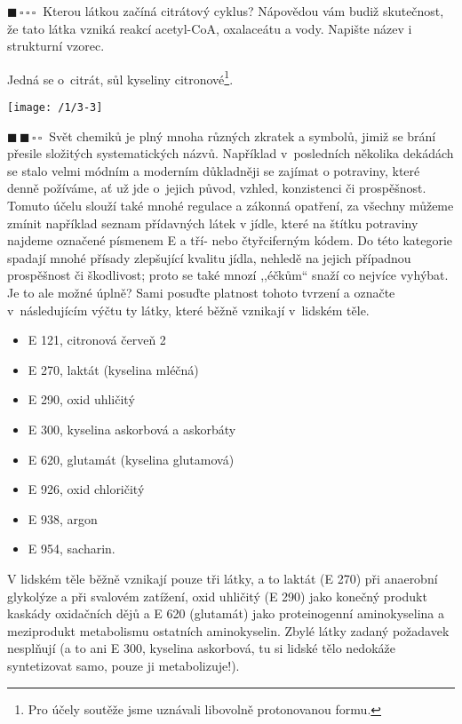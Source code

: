 \documentclass{book}
\newcommand{\jeden}{$\blacksquare \, \square \, \square \, \square \; \; $}
\newcommand{\dva}{$\blacksquare \, \blacksquare \, \square \, \square \; \; $}
\renewenvironment{quotation}{\par}{\par} %
\begin{document}
\hrulefill %
\begin{quotation}
\jeden Kterou látkou začíná citrátový cyklus? Nápovědou vám budiž skutečnost,
že tato látka vzniká reakcí acetyl-CoA, oxalaceátu a vody. Napište
název i strukturní vzorec.
\end{quotation} \dotfill \par 
Jedná se o~citrát, sůl kyseliny citronové\footnote{Pro účely soutěže jsme uznávali libovolně protonovanou formu.}. 

\begin{center}
\texttt{[image: /1/3-3]}
\end{center}


\newpage %
\begin{quotation}
\dva Svět chemiků je plný mnoha různých zkratek a symbolů, jimiž se brání
přesile složitých systematických názvů. Například v~posledních několika
dekádách se stalo velmi módním a moderním důkladněji se zajímat o
potraviny, které denně požíváme, ať už jde o~jejich původ, vzhled,
konzistenci či prospěšnost. Tomuto účelu slouží také mnohé regulace
a zákonná opatření, za všechny můžeme zmínit například seznam přídavných látek
v jídle, které na štítku potraviny najdeme označené písmenem E a tří-
nebo čtyřciferným kódem. Do této kategorie spadají mnohé přísady zlepšující
kvalitu jídla, nehledě na jejich případnou prospěšnost či škodlivost;
proto se také mnozí ,,éčkům`` snaží co nejvíce vyhýbat. Je to ale možné
úplně? Sami posuďte platnost tohoto tvrzení a označte v~následujícím
výčtu ty látky, které běžně vznikají v~lidském těle. 
\begin{itemize}
\item E 121, citronová červeň 2 
\item E 270, laktát (kyselina mléčná) 
\item E 290, oxid uhličitý 
\item E 300, kyselina askorbová a askorbáty 
\item E 620, glutamát (kyselina glutamová)
\item E 926, oxid chloričitý
\item E 938, argon
\item E 954, sacharin. 
\end{itemize}
\end{quotation} \dotfill \par 
V lidském těle běžně vznikají pouze tři látky, a to laktát (E 270)
při anaerobní glykolýze a při svalovém zatížení, oxid uhličitý (E
290) jako konečný produkt kaskády oxidačních dějů a E 620 (glutamát)
jako proteinogenní aminokyselina a meziprodukt metabolismu ostatních
aminokyselin. Zbylé látky zadaný požadavek nesplňují (a to ani E 300,
kyselina askorbová, tu si lidské tělo nedokáže syntetizovat samo,
pouze ji metabolizuje!). 
\end{document}
